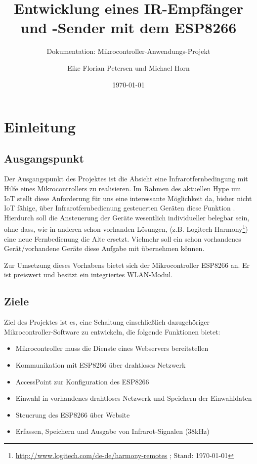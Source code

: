 			
\usepackage{tikz}			
\usetikzlibrary{shapes,arrows} %



\title{Entwicklung eines IR-Empfänger und -Sender mit dem ESP8266}
\subtitle{Dokumentation: Mikrocontroller-Anwendungs-Projekt}
\author{Eike Florian Petersen und Michael Horn} 
\date{\today}

\maketitle

\tableofcontents										%
\pagebreak

\section{Einleitung}
\subsection{Ausgangspunkt}
Der Ausgangspunkt des Projektes ist die Absicht eine Infrarotfernbedingung mit Hilfe eines Mikrocontrollers zu realisieren. Im Rahmen des aktuellen Hype um \acs{IoT} stellt diese Anforderung für uns eine interessante Möglichkeit da, bisher nicht \acs{IoT} fähige, über Infrarotfernbedienung gesteuerten Geräten diese Funktion . Hierdurch soll die Ansteuerung der Geräte wesentlich individueller belegbar sein, ohne dass, wie in anderen schon vorhanden Lösungen, (z.B. Logitech Harmony\footnote{ \url{http://www.logitech.com/de-de/harmony-remotes} ; Stand: \today}) eine neue Fernbedienung die Alte ersetzt. Vielmehr soll ein schon vorhandenes Gerät/vorhandene Geräte diese Aufgabe mit übernehmen können.

Zur Umsetzung dieses Vorhabens bietet sich der Mikrocontroller ESP8266 an.
Er ist preiswert und besitzt ein integriertes WLAN-Modul.

\subsection{Ziele}
Ziel des Projektes ist es, eine Schaltung einschließlich dazugehöriger Mikrocontroller-Software zu entwickeln, die folgende Funktionen bietet:

\begin{itemize}
	\item Mikrocontroller muss die Dienste eines Webservers bereitstellen
	\item Kommunikation mit ESP8266 über drahtloses Netzwerk
	\item AccessPoint zur Konfiguration des ESP8266
	\item Einwahl in vorhandenes drahtloses Netzwerk und Speichern der Einwahldaten
	\item Steuerung des ESP8266 über Website
	\item Erfassen, Speichern und Ausgabe von Infrarot-Signalen (38kHz)
\end{itemize}

